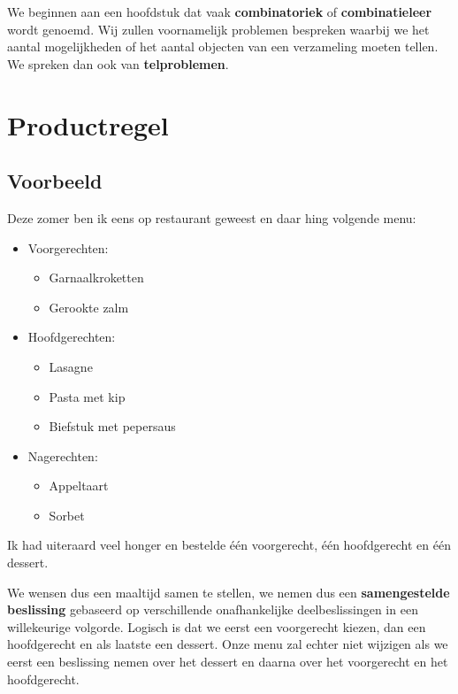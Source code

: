 \documentclass[12pt,a4paper,twoside]{article}
\begin{document}
We beginnen aan een hoofdstuk dat vaak {\bf combinatoriek} of {\bf combinatieleer} wordt genoemd. Wij zullen voornamelijk problemen bespreken waarbij we het aantal mogelijkheden of het aantal objecten van een verzameling moeten tellen. We spreken dan ook van {\bf telproblemen}.


\section{Productregel}

\subsection{Voorbeeld}

Deze zomer ben ik eens op restaurant geweest en daar hing volgende menu:

\begin{center}
  \begin{minipage}{0.6\linewidth}
    \begin{mdframed}
      \begin{itemize}
      \item Voorgerechten:
        \begin{itemize}
        \item Garnaalkroketten
        \item Gerookte zalm
        \end{itemize}
      \item Hoofdgerechten:
        \begin{itemize}
        \item Lasagne
        \item Pasta met kip
        \item Biefstuk met pepersaus
        \end{itemize}
      \item Nagerechten:
        \begin{itemize}
        \item Appeltaart
        \item Sorbet
        \end{itemize}
      \end{itemize}
    \end{mdframed}
  \end{minipage}
\end{center}

Ik had uiteraard veel honger en bestelde één voorgerecht, één hoofdgerecht en één dessert.

We wensen dus een maaltijd samen te stellen, we nemen dus een {\bf samengestelde beslissing} gebaseerd op verschillende onafhankelijke deelbeslissingen in een willekeurige volgorde. Logisch is dat we eerst een voorgerecht kiezen, dan een hoofdgerecht en als laatste een dessert. Onze menu zal echter niet wijzigen als we eerst een beslissing nemen over het dessert en daarna over het voorgerecht en het hoofdgerecht.
\end{document}

